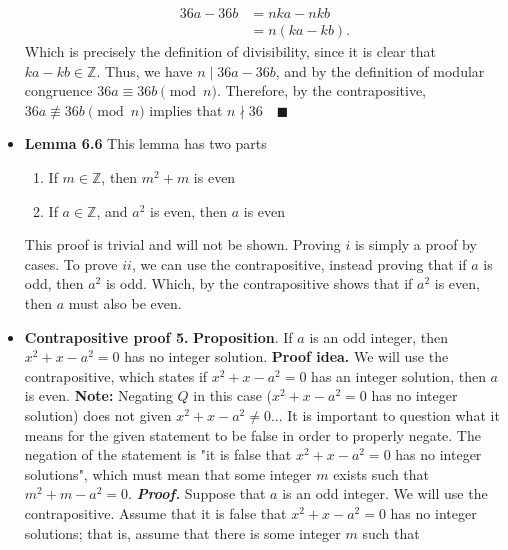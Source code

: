 \documentclass{report}
\begin{document}
\begin{itemize}
            \begin{align*}
                36a - 36b &= nka - nkb \\
                          &=n(ka-kb)
            .\end{align*}
            Which is precisely the definition of divisibility, since it is clear that $ka-kb \in \mathbb{Z}$. Thus, we have $n \mid 36a -36b $, and by the definition of modular congruence $36a  \equiv 36b \pmod{n}$.
            \bigbreak \noindent 
            Therefore, by the contrapositive, $36a \not\equiv 36b \pmod{n}$ implies that $n\nmid 36 \quad \blacksquare $
        \item \textbf{Lemma 6.6} This lemma has two parts
            \begin{enumerate}[label=(\roman*)]
                \item If $m\in\mathbb{Z} $, then $m^{2}  + m $ is even 
                \item If $a\in \mathbb{Z}$, and $a^{2}$ is even, then $a$ is even
            \end{enumerate}
            This proof is trivial and will not be shown. Proving $i$ is simply a proof by cases. To prove $ii$, we can use the contrapositive, instead proving that if $a$ is odd, then $a^{2}$ is odd. Which, by the contrapositive shows that if $a^{2}$ is even, then $a$ must also be even.
        \item \textbf{Contrapositive proof 5.} 
            \bigbreak \noindent 
            \textbf{Proposition}. If $a$ is an odd integer, then $x^{2} + x - a^{2}=  0$ has no integer solution.
            \bigbreak \noindent 
            \textbf{Proof idea.} We will use the contrapositive, which states if $x^{2} + x - a^{2} = 0$ has an integer solution, then $a$ is even.
            \bigbreak \noindent 
            \textbf{Note:} Negating $Q$ in this case ($x^{2} + x - a^{2} = 0 $ has no integer solution) does not given $x^{2} +x - a^{2} \ne 0 $... It is important to question what it means for the given statement to be false in order to properly negate. The negation of the statement is "it is false that $x^{2} + x  -a^{2} = 0 $ has no integer solutions", which must mean that some integer $m$ exists such that $m^{2} + m -a^{2} = 0$.
            \bigbreak \noindent 
            \textbf{\textit{Proof.}} Suppose that \(a\) is an odd integer. We will use the contrapositive. Assume that it is false that \(x^2 + x - a^2 = 0\) has no integer solutions; that is, assume that there is some integer \(m\) such that
            \begin{align*}

\end{align*}
\end{itemize}
\end{document}

